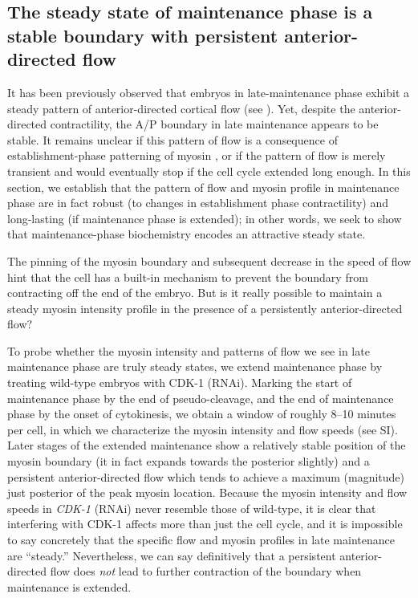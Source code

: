 \documentclass[11pt]{article}
\newcommand{\6}[1]{#1_{\text{6}}}
\newcommand{\3}[1]{#1_{\text{3}}}
\begin{document}
\subsection*{The steady state of maintenance phase is a stable boundary with persistent anterior-directed flow}
It has been previously observed that embryos in late-maintenance phase exhibit a steady pattern of anterior-directed cortical flow (see \citep[Fig.~2]{sailer2015dynamic}). Yet, despite the anterior-directed contractility, the A/P boundary in late maintenance appears to be stable. It remains unclear if this pattern of flow is a consequence of establishment-phase patterning of myosin \citep{munro2004cortical}, or if the pattern of flow is merely transient and would eventually stop if the cell cycle extended long enough. In this section, we establish that the pattern of flow and myosin profile in maintenance phase are in fact robust (to changes in establishment phase contractility) and long-lasting (if maintenance phase is extended); in other words, we seek to show that maintenance-phase biochemistry encodes an attractive steady state. 

The pinning of the myosin boundary and subsequent decrease in the speed of flow hint that the cell has a built-in mechanism to prevent the boundary from contracting off the end of the embryo. But is it really possible to maintain a steady myosin intensity profile in the presence of a persistently anterior-directed flow? 

To probe whether the myosin intensity and patterns of flow we see in late maintenance phase are truly steady states, we extend maintenance phase by treating wild-type embryos with CDK-1 (RNAi). Marking the start of maintenance phase by the end of pseudo-cleavage, and the end of maintenance phase by the onset of cytokinesis, we obtain a window of roughly 8--10 minutes per cell, in which we characterize the myosin intensity and flow speeds (see SI). Later stages of the extended maintenance show a relatively stable position of the myosin boundary (it in fact expands towards the posterior slightly) and a persistent anterior-directed flow which tends to achieve a maximum (magnitude) just posterior of the peak myosin location. Because the myosin intensity and flow speeds in \emph{CDK-1} (RNAi) never resemble those of wild-type, it is clear that interfering with CDK-1 affects more than just the cell cycle, and it is impossible to say concretely that the specific flow and myosin profiles in late maintenance are ``steady.'' Nevertheless, we can say definitively that a persistent anterior-directed flow does \emph{not} lead to further contraction of the boundary when maintenance is extended.
\end{document}
